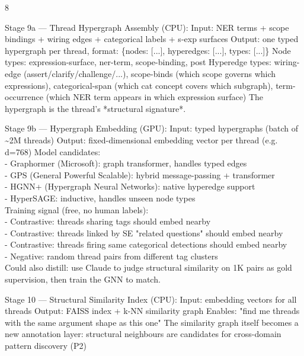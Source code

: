 \documentclass[landscape]{article}
\begin{document}
\begin{paracol}{8}
\par
    Stage 9a — Thread Hypergraph Assembly (CPU): Input: NER terms + scope bindings + wiring edges + categorical labels + s-exp surfaces Output: one typed hypergraph per thread, format: \{nodes: [...], hyperedges: [...], types: [...]\} Node types: expression-surface, ner-term, scope-binding, post Hyperedge types: wiring-edge (assert/clarify/challenge/...), scope-binds (which scope governs which expressions), categorical-span (which cat concept covers which subgraph), term-occurrence (which NER term appears in which expression surface) The hypergraph is the thread’s *structural signature*.\\
\par
    Stage 9b — Hypergraph Embedding (GPU): Input: typed hypergraphs (batch of \textasciitilde{}2M threads) Output: fixed-dimensional embedding vector per thread (e.g. d=768) Model candidates:\\
        - Graphormer (Microsoft): graph transformer, handles typed edges\\
        - GPS (General Powerful Scalable): hybrid message-passing + transformer\\
        - HGNN+ (Hypergraph Neural Networks): native hyperedge support\\
        - HyperSAGE: inductive, handles unseen node types\\
      Training signal (free, no human labels):\\
        - Contrastive: threads sharing tags should embed nearby\\
        - Contrastive: threads linked by SE "related questions" should embed nearby\\
        - Contrastive: threads firing same categorical detections should embed nearby\\
        - Negative: random thread pairs from different tag clusters\\
      Could also distill: use Claude to judge structural similarity on 1K pairs as gold supervision, then train the GNN to match.\\
\par
    Stage 10 — Structural Similarity Index (CPU): Input: embedding vectors for all threads Output: FAISS index + k-NN similarity graph Enables: "find me threads with the same argument shape as this one" The similarity graph itself becomes a new annotation layer: structural neighbours are candidates for cross-domain pattern discovery (P2)\\
\par

\end{paracol}
\end{document}
